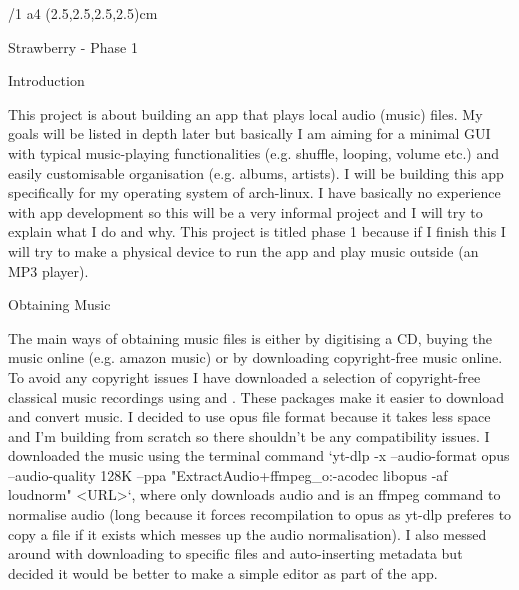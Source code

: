 \message{\optexversion}
\fontfam[LMfonts]
\typosize[11/13]
\margins/1 a4 (2.5,2.5,2.5,2.5)cm


\tit Strawberry - Phase 1

\chap Introduction

This project is about building an app that plays local audio (music) files. My goals will be listed in depth later but basically I am aiming for a minimal GUI with typical music-playing functionalities (e.g. shuffle, looping, volume etc.) and easily customisable organisation (e.g. albums, artists). I will be building this app specifically for my operating system of arch-linux. I have basically no experience with app development so this will be a very informal project and I will try to explain what I do and why. This project is titled phase 1 because if I finish this I will try to make a physical device to run the app and play music outside (an MP3 player). 

\sec Obtaining Music

The main ways of obtaining music files is either by digitising a CD, buying the music online (e.g. amazon music) or by downloading copyright-free music online. To avoid any copyright issues I have downloaded a selection of copyright-free classical music recordings using  and . These packages make it easier to download and convert music. I decided to use opus file format because it takes less space and I'm building from scratch so there shouldn't be any compatibility issues. I downloaded the music using the terminal command `yt-dlp -x --audio-format opus --audio-quality 128K --ppa "ExtractAudio+ffmpeg_o:-acodec libopus -af loudnorm" <URL>`, where  only downloads audio and  is an ffmpeg command to normalise audio (long because it forces recompilation to opus as yt-dlp preferes to copy a file if it exists which messes up the audio normalisation). I also messed around with downloading to specific files and auto-inserting metadata but decided it would be better to make a simple editor as part of the app.  

\bye
